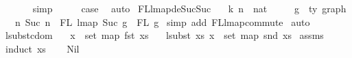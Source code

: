 \begin{isabellebody}
\ \ \ \ \ \isamarkupfalse%
\ simp\isanewline
\ \ \isamarkupfalse%
\ \isamarkupfalse%
\ {\isacharquery}{\kern0pt}case\ \isakeywordONE{{\isachardot}{\kern0pt}}\isamarkupfalse%
\isanewline
{}\isamarkupfalse%
\ auto%
\endisatagproof
{\isafoldproof}%
%
\isadelimproof
\isanewline
%
\endisadelimproof
\isanewline
\isanewline
{}\isamarkupfalse%
\ FL{\isacharunderscore}{\kern0pt}lmap{\isacharunderscore}{\kern0pt}deSuc{\isacharunderscore}{\kern0pt}Suc{\isacharcolon}{\kern0pt}\isanewline
\ \ \ k\ n\ {\isacharcolon}{\kern0pt}{\isacharcolon}{\kern0pt}\ nat\isanewline
\ \ \ \ \ g\ {\isacharcolon}{\kern0pt}{\isacharcolon}{\kern0pt}\ {\isachardoublequoteopen}{\isacharprime}{\kern0pt}ty\ graph{\isachardoublequoteclose}\isanewline
\ \ \ {\isachardoublequoteopen}{\isacharbraceleft}{\kern0pt}n{\isachardot}{\kern0pt}\ Suc\ n\ {\isasymin}\ FL\ {\isacharparenleft}{\kern0pt}lmap\ Suc\ g{\isacharparenright}{\kern0pt}{\isacharbraceright}{\kern0pt}\ {\isacharequal}{\kern0pt}\ FL\ g{\isachardoublequoteclose}\isanewline
%
\isadelimproof
%
\endisadelimproof
%
\isatagproof
{}\isamarkupfalse%
\ {\isacharparenleft}{\kern0pt}simp\ add{\isacharcolon}{\kern0pt}\ FL{\isacharunderscore}{\kern0pt}lmap{\isacharunderscore}{\kern0pt}commute{\isacharparenright}{\kern0pt}\isanewline
{}\isamarkupfalse%
\ auto%
\endisatagproof
{\isafoldproof}%
%
\isadelimproof
%
\endisadelimproof
%
\isadelimdocument
%
\endisadelimdocument
%
\isatagdocument
%
\isamarkuptrue%
%
\endisatagdocument
{\isafolddocument}%
%
\isadelimdocument
%
\endisadelimdocument
{}\isamarkupfalse%
\ lsubst{\isacharunderscore}{\kern0pt}cdom{\isacharcolon}{\kern0pt}\isanewline
\ \ \ {\isachardoublequoteopen}x\ {\isasymin}\ set\ {\isacharparenleft}{\kern0pt}map\ fst\ xs{\isacharparenright}{\kern0pt}{\isachardoublequoteclose}\isanewline
\ \ \ {\isachardoublequoteopen}lsubst\ xs\ x\ {\isasymin}\ set\ {\isacharparenleft}{\kern0pt}map\ snd\ xs{\isacharparenright}{\kern0pt}{\isachardoublequoteclose}\isanewline
%
\isadelimproof
%
\endisadelimproof
%
\isatagproof
{}\isamarkupfalse%
\ assms\isanewline
{}\isamarkupfalse%
\ {\isacharparenleft}{\kern0pt}induct\ xs{\isacharparenright}{\kern0pt}\isanewline
\ \ \isamarkupfalse%
\ Nil\isanewline
\ \ \isamarkupfalse%

\end{isabellebody}
